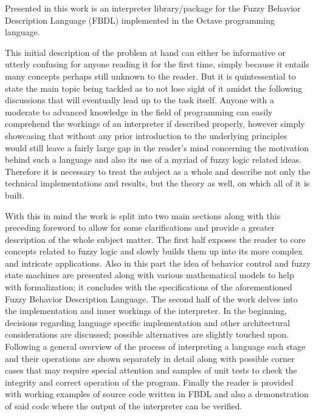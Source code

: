 
Presented in this work is an interpreter library/package for the Fuzzy Behavior Description Language (FBDL) implemented in the Octave programming language.

This initial description of the problem at hand can either be informative or utterly confusing for anyone reading it for the first time, simply because it entails many concepts perhaps still unknown to the reader. But it is quintessential to state the main topic being tackled as to not lose sight of it amidst the following discussions that will eventually lead up to the task itself. Anyone with a moderate to advanced knowledge in the field of programming can easily comprehend the workings of an interpreter if described properly, however simply showcasing that without any prior introduction to the underlying principles would still leave a fairly large gap in the reader's mind concerning the motivation behind such a language and also its use of a myriad of fuzzy logic related ideas. Therefore it is necessary to treat the subject as a whole and describe not only the technical implementations and results, but the theory as well, on which all of it is built.

With this in mind the work is split into two main sections along with this preceding foreword to allow for some clarifications and provide a greater description of the whole subject matter. The first half exposes the reader to core concepts related to fuzzy logic and slowly builds them up into its more complex and intricate applications. Also in this part the idea of behavior control and fuzzy state machines are presented along with various mathematical models to help with formalization; it concludes with the specifications of the aforementioned Fuzzy Behavior Description Language. The second half of the work delves into the implementation and inner workings of the interpreter. In the beginning, decisions regarding language specific implementation and other architectural considerations are discussed; possible alternatives are slightly touched upon. Following a general overview of the process of interpreting a language each stage and their operations are shown separately in detail along with possible corner cases that may require special attention and samples of unit tests to check the integrity and correct operation of the program. Finally the reader is provided with working examples of source code written in FBDL and also a demonstration of said code where the output of the interpreter can be verified.

